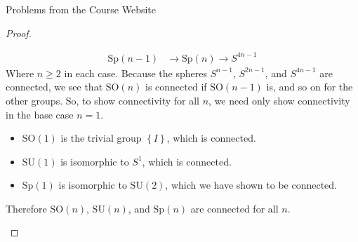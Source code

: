 \documentclass[12pt]{article}
\newcommand{\Sp}{\text{Sp}}
\theoremstyle{definition}
\newenvironment{problem}[2][Problem]{\begin{trivlist}
\item[\hskip \labelsep {\bfseries #1}\hskip \labelsep {\bfseries #2.}]}{\end{trivlist}}
\begin{document}
\begin{section}{Problems from the Course Website}
\begin{problem}{2}
\begin{proof}
\begin{enumerate}[label=(\alph*)]
\begin{align*}
	    \Sp(n-1) & \to \Sp(n) \to S^{4n - 1}
    \end{align*} Where $n \geq 2$ in each case. Because the spheres $S^{n-1}$, $S^{2n-1}$, and $S^{4n - 1}$ are connected, we see that $\text{SO}(n)$ is connected if $\text{SO}(n-1)$ is, and so on for the other groups. So, to show connectivity for all $n$, we need only show connectivity in the base case $n = 1$.
    \begin{itemize}
	    \item $\text{SO}(1)$ is the trivial group $\left\{ I \right\}$, which is connected.
	    \item $\text{SU}(1)$ is isomorphic to $S^1$, which is connected.
	    \item $\text{Sp}(1)$ is isomorphic to $\text{SU}(2)$, which we have shown to be connected.
    \end{itemize}
    Therefore $\text{SO}(n)$, $\text{SU}(n)$, and $\Sp(n)$ are connected for all $n$.


\end{enumerate}
\end{proof}
\end{problem}
\end{section}
\end{document}
